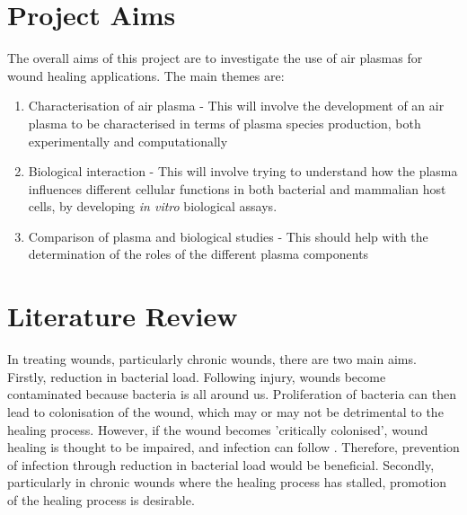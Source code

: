 \documentclass[11pt, oneside]{article}   	%
\begin{document}
\section{Project Aims}
The overall aims of this project are to investigate the use of air plasmas for wound healing applications.
The main themes are:
\begin{enumerate}
\item Characterisation of air plasma - This will involve the development of an air plasma to be characterised in terms of plasma species production, both experimentally and computationally
\item Biological interaction - This will involve trying to understand how the plasma influences different cellular functions in both bacterial and mammalian host cells, by developing \textit{in vitro} biological assays. 
\item Comparison of plasma and biological studies - This should help with the determination of the roles of the different plasma components
\end{enumerate}

\section{Literature Review}
In treating wounds, particularly chronic wounds, there are two main aims.
Firstly, reduction in bacterial load. 
Following injury, wounds become contaminated because bacteria is all around us. 
Proliferation of bacteria can then lead to colonisation of the wound, which may or may not be detrimental to the healing process. 
However, if the wound becomes 'critically colonised', wound healing is thought to be impaired, and infection can follow \cite{Siddiqui2010chronic}. 
Therefore, prevention of infection through reduction in bacterial load would be beneficial.
Secondly, particularly in chronic wounds where the healing process has stalled, promotion of the healing process is desirable.
\end{document}
